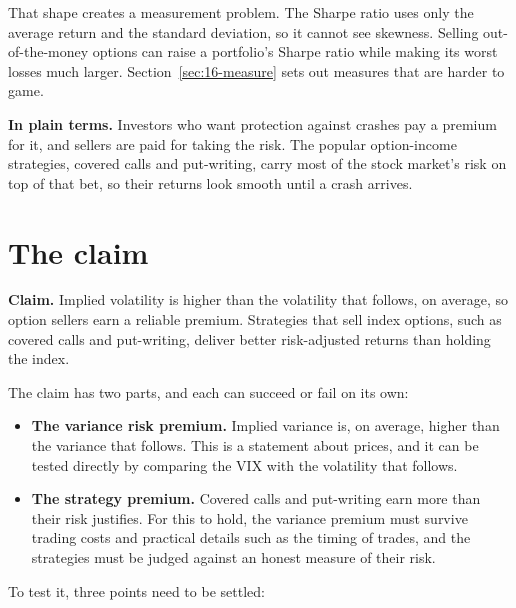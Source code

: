 That shape creates a measurement problem. The Sharpe ratio uses only the average return and the standard deviation, so it cannot see skewness. Selling out-of-the-money options can raise a portfolio's Sharpe ratio while making its worst losses much larger. Section~\ref{sec:16-measure} sets out measures that are harder to game.

\noindent\textbf{In plain terms.} Investors who want protection against crashes pay a premium for it, and sellers are paid for taking the risk. The popular option-income strategies, covered calls and put-writing, carry most of the stock market's risk on top of that bet, so their returns look smooth until a crash arrives.

\section{The claim}
\label{sec:16-claim}

\begin{callout}
\textbf{Claim.} Implied volatility is higher than the volatility that follows, on average, so option sellers earn a reliable premium. Strategies that sell index options, such as covered calls and put-writing, deliver better risk-adjusted returns than holding the index.
\end{callout}

The claim has two parts, and each can succeed or fail on its own:

\begin{itemize}
  \item \textbf{The variance risk premium.} Implied variance is, on average, higher than the variance that follows. This is a statement about prices, and it can be tested directly by comparing the VIX with the volatility that follows.
  \item \textbf{The strategy premium.} Covered calls and put-writing earn more than their risk justifies. For this to hold, the variance premium must survive trading costs and practical details such as the timing of trades, and the strategies must be judged against an honest measure of their risk.
\end{itemize}

To test it, three points need to be settled:

